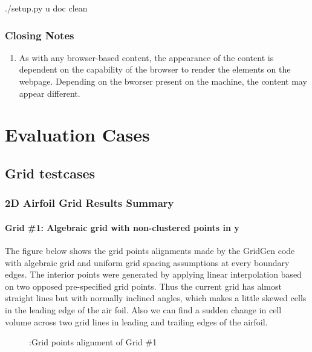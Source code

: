 \documentclass[letterpaper,10pt,english]{sphinxmanual}
\begin{document}
\begin{sphinxVerbatim}[commandchars=\\\{\}]
\PYGZdl{} ./setup.py \PYGZhy{}u doc clean
\end{sphinxVerbatim}


\subsubsection{Closing Notes}
\label{\detokenize{gridpyfiles/documentation:closing-notes}}\begin{enumerate}
\item {} 
As with any browser-based content, the appearance of the content is dependent on the capability of the browser to render the elements on the webpage. Depending on the bworser present on the machine, the content may appear different.

\end{enumerate}


\section{Evaluation Cases}
\label{\detokenize{testcases:evaluation-cases}}\label{\detokenize{testcases::doc}}\label{\detokenize{testcases:testcases-main}}

\subsection{Grid testcases}
\label{\detokenize{testcases:grid-testcases}}\label{\detokenize{testcases:test-cases}}

\subsubsection{2D Airfoil Grid Results Summary}
\label{\detokenize{cases/grid_af:d-airfoil-grid-results-summary}}\label{\detokenize{cases/grid_af::doc}}

\paragraph{Grid \#1: Algebraic grid with non-clustered points in y}
\label{\detokenize{cases/grid_af:grid-1-algebraic-grid-with-non-clustered-points-in-y}}
The figure below shows the grid points alignments made by the GridGen code with algebraic grid and uniform grid spacing assumptions at every boundary edges. The interior points were generated by applying linear interpolation based on two opposed pre-specified grid points. Thus the current grid has almost straight lines but with normally inclined angles, which makes a little skewed cells in the leading edge of the air foil. Also we can find a sudden change in cell volume across two grid lines in leading and trailing edges of the airfoil.
\begin{figure}[htbp]
\centering
\capstart

\noindent{}
\caption{:Grid points alignment of Grid \#1}\label{\detokenize{cases/grid_af:id1}}\end{figure}
\end{document}
